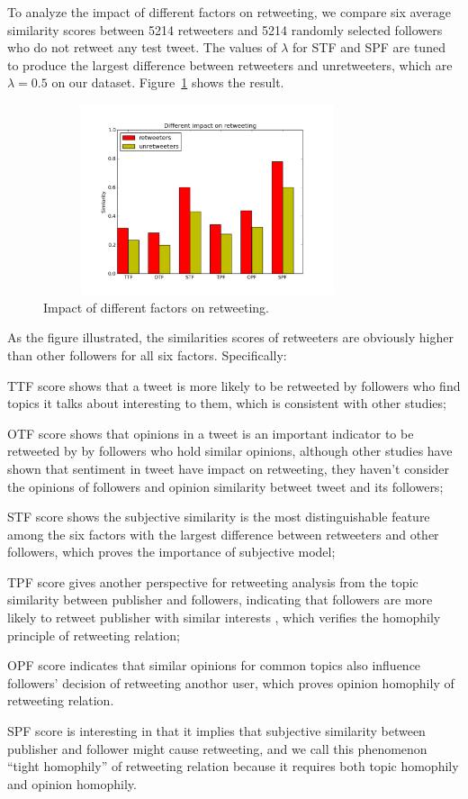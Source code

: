 \documentclass{acm_proc_article-sp}
\begin{document}
To analyze the impact of different factors on retweeting, we compare six average similarity scores between 5214 retweeters and 5214 randomly selected followers who do not retweet any test tweet. The values of $ \lambda $ for STF and SPF are tuned to produce the largest difference between retweeters and unretweeters, which are $ \lambda =0.5 $ on our dataset. Figure~\ref{fig:graph6} shows the result.
\begin{figure}[htb]
\centering
\includegraphics[width=3.8in,height=2.2in]{component.pdf}
\vspace{-2em}
\caption{Impact of different factors on retweeting.}
\label{fig:graph6}
\end{figure}
As the figure illustrated, the similarities scores of retweeters are obviously higher than other followers for all six factors. Specifically: 
\begin{itemize*}
\item TTF score shows that a tweet is more likely to be retweeted by followers who find topics it talks about interesting to them, which is consistent with other studies\cite{conf/icwsm/MacskassyM11, conf/wsdm/FengW13};
\item OTF score shows that opinions in a tweet is an important indicator to be retweeted by by followers who hold similar opinions, although other studies\cite{conf/icwsm/PfitznerGS12,2011:NaveedGKC} have shown that sentiment in tweet have impact on retweeting, they haven't consider the opinions of followers and opinion similarity betweet tweet and its followers;
\item STF score shows the subjective similarity is the most distinguishable feature among the six factors with the largest difference between retweeters and other followers, which proves the importance of subjective model;
\item TPF score gives another perspective for retweeting analysis from the topic similarity between publisher and followers, indicating that followers are more likely to retweet publisher with similar interests , which verifies the homophily principle of retweeting relation;
\item OPF score indicates that similar opinions for common topics also influence followers' decision of retweeting anothor user, which proves opinion homophily of retweeting relation.
\item SPF score is interesting in that it implies that subjective similarity between publisher and follower might cause retweeting, and we call this phenomenon ``tight homophily'' of retweeting relation because it requires both topic homophily and opinion homophily.
\end{itemize*} 
\end{document}

